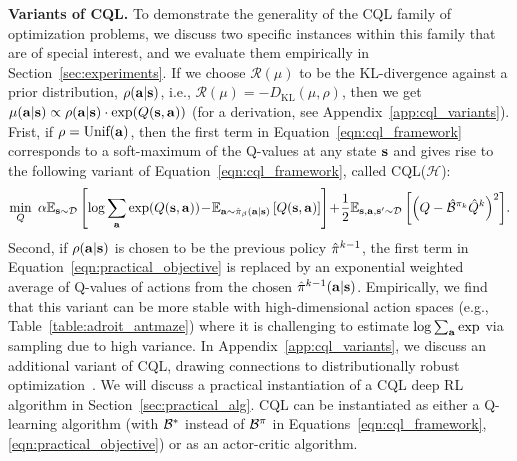 \textbf{Variants of CQL.} To demonstrate the generality of the CQL family of optimization problems, we discuss two specific instances within this family that are of special interest, and we evaluate them empirically in Section~\ref{sec:experiments}. 
If we choose $\mathcal{R}(\mu)$ to be the KL-divergence against a prior distribution, $\rho(\mathbf{a}|\mathbf{s})$, i.e., $\mathcal{R}(\mu) = -D_{\mathrm{KL}}(\mu, \rho)$, then we get $\mu(\mathbf{a}|\mathbf{s}) \propto \rho(\mathbf{a}|\mathbf{s}) \cdot \exp (Q(\mathbf{s}, \mathbf{a}))$ (for a derivation, see Appendix~\ref{app:cql_variants}). Frist, if $\rho = \text{Unif}(\mathbf{a})$,
then the first term in Equation~\ref{eqn:cql_framework} corresponds to a soft-maximum of the Q-values at any state $\mathbf{s}$ and gives rise to the following variant of Equation~\ref{eqn:cql_framework}, called CQL($\mathcal{H}$):
\begin{equation}
    \small{\min_{Q}~ \alpha \mathbb{E}_{\mathbf{s}\sim \mathcal{D}}\left[\log \sum_{\mathbf{a}} \exp(Q(\mathbf{s}, \mathbf{a}))\!-\!\mathbb{E}_{\mathbf{a}\sim \hat{\pi}_\beta(\mathbf{a}|\mathbf{s})}\left[Q(\mathbf{s}, \mathbf{a})\right]\right]\!+\!\frac{1}{2} \mathbb{E}_{\mathbf{s}, \mathbf{a}, \mathbf{s}' \sim \mathcal{D}}\left[\left(Q - \hat{\mathcal{B}}^{\pi_k} \hat{Q}^{k} \right)^2 \right]\!.}
    \label{eqn:practical_objective}
\end{equation}
Second, if $\rho(\mathbf{a}|\mathbf{s})$ is chosen to be the previous policy $\hat{\pi}^{k-1}$, the first term in Equation~\ref{eqn:practical_objective} is replaced by an exponential weighted average of Q-values of actions from the chosen $\hat{\pi}^{k-1}(\mathbf{a}|\mathbf{s})$. Empirically, we find that this variant can be more stable with high-dimensional action spaces (e.g., Table~\ref{table:adroit_antmaze}) where it is challenging to estimate $\log \sum_{\mathbf{a}} \exp$ via sampling due to high variance. In Appendix~\ref{app:cql_variants}, we discuss an additional variant of CQL, drawing connections to distributionally robust optimization~\citep{namkoong2017variance}.  
We will discuss a practical instantiation of a CQL deep RL algorithm in Section~\ref{sec:practical_alg}. CQL can be instantiated as either a Q-learning algorithm (with $\mathcal{B}^*$ instead of $\mathcal{B}^{\pi}$ in Equations~\ref{eqn:cql_framework}, \ref{eqn:practical_objective}) or as an actor-critic algorithm. 

